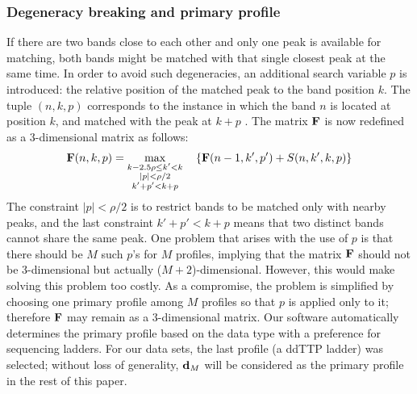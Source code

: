 \subsubsection{Degeneracy breaking and primary profile}\label{sss:primary_profile}
 If there are two bands close to each other and only one peak is available for matching, both bands might be matched with that single closest peak at the same time. In order to avoid such degeneracies, an additional search variable $p$ is introduced: the relative position of the matched peak to the band position $k$. The tuple $(n,k,p)$ corresponds to the instance in which the band $n$ is located at position $k$, and matched with the peak at $k+p$ . The matrix ${\mathbf{F}}$ is now redefined as a 3-dimensional matrix as follows:
%
\begin{equation}\label{e:F2}
{\mathbf{F}}(n,k,p) = \max_{\substack{k-2.5\rho \le k' < k\\|p| < \rho/2\\k'+p' < k+p}}\quad \left\{ {\mathbf{F}}(n-1,k',p') + S(n,k',k,p) \right\}
\end{equation}
%
The constraint $|p| < \rho/2$ is to restrict bands to be matched only with nearby peaks, and the last constraint $k'+p'<k+p$ means that two distinct bands cannot share the same peak. One problem that arises with the use of $p$ is that there should be $M$ such $p$'s for $M$ profiles, implying that the matrix ${\mathbf{F}}$ should not be 3-dimensional but actually ($M+2$)-dimensional. However, this would make solving this problem too costly. As a compromise, the problem is simplified by choosing one primary profile among $M$ profiles so that $p$ is applied only to it; therefore ${\mathbf{F}}$ may remain as a 3-dimensional matrix. Our software automatically determines the primary profile based on the data type with a preference for sequencing ladders. For our data sets, the last profile (a ddTTP ladder) was selected; without loss of generality, ${\mathbf{d}}_M$ will be considered as the primary profile in the rest of this paper.

